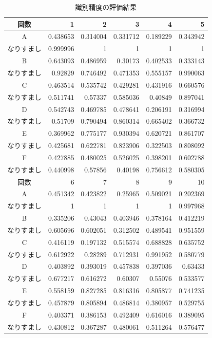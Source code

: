 \begin{table}[btph]
  \centering
  \caption{識別精度の評価結果}
  \label{auth-result}
  \begin{tabular}{|c|r|r|r|r|r|} \hline
    回数 & 1 & 2 & 3 & 4 & 5 \\ \hline
    A & 0.438653 & 0.314004 & 0.331712 & 0.189229 & 0.343942 \\
    なりすまし & 0.999996 & 1 & 1 & 1 & 1 \\ \hline
    B & 0.643093 & 0.486959 & 0.30173 & 0.402533 & 0.333143 \\
    なりすまし & 0.92829 & 0.746492 & 0.471353 & 0.555157 & 0.990063 \\ \hline
    C & 0.463514 & 0.535742 & 0.429281 & 0.431916 & 0.660576 \\
    なりすまし & 0.511741 & 0.57337 & 0.585036 & 0.40849 & 0.897041 \\ \hline
    D & 0.542743 & 0.469785 & 0.478641 & 0.206191 & 0.316994 \\
    なりすまし & 0.51709 & 0.790494 & 0.860314 & 0.665402 & 0.366732 \\ \hline
    E & 0.369962 & 0.775177 & 0.930394 & 0.620721 & 0.861707 \\
    なりすまし & 0.425681 & 0.622781 & 0.823906 & 0.322503 & 0.808092 \\ \hline
    F & 0.427885 & 0.480025 & 0.526025 & 0.398201 & 0.602788 \\
    なりすまし & 0.440998 & 0.57856 & 0.40198 & 0.756612 & 0.580305 \\ \hline \hline
    回数 & 6 & 7 & 8 & 9 & 10 \\ \hline
    A & 0.451342 & 0.423822 & 0.25965 & 0.509021 & 0.202369 \\
    なりすまし & 1 & 1 & 1 & 1 & 0.997968 \\ \hline
    B & 0.335206 & 0.43043 & 0.403946 & 0.378164 & 0.412219 \\
    なりすまし & 0.605696 & 0.602051 & 0.312502 & 0.489541 & 0.951559 \\ \hline
    C & 0.416119 & 0.197132 & 0.515574 & 0.688828 & 0.635752 \\
    なりすまし & 0.612922 & 0.28289 & 0.712931 & 0.991952 & 0.580779 \\ \hline
    D & 0.403892 & 0.393019 & 0.457838 & 0.397036 & 0.63433 \\
    なりすまし & 0.677217 & 0.616272 & 0.60307 & 0.55076 & 0.533577 \\ \hline
    E & 0.558159 & 0.827285 & 0.816316 & 0.805877 & 0.741235 \\
    なりすまし & 0.457879 & 0.805894 & 0.486814 & 0.380957 & 0.529755 \\ \hline
    F & 0.403371 & 0.386153 & 0.492409 & 0.616016 & 0.389095 \\
    なりすまし & 0.430812 & 0.367287& 0.480061 & 0.511264 & 0.576477 \\ \hline
  \end{tabular}
\end{table}

